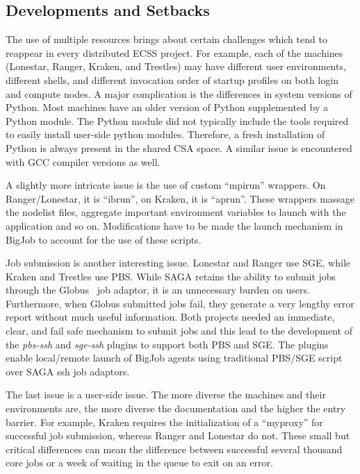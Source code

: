 \documentclass{sig-alternate}
\begin{document}
\subsection{Developments and Setbacks}

The use of multiple resources brings about certain challenges which tend to reappear in 
every distributed ECSS project. For example, each of the machines (Lonestar, Ranger, 
Kraken, and Trestles) may have different user environments, different shells, and 
different invocation order of startup profiles on both login and compute nodes. A major 
complication is the differences in system versions of Python. Most machines have an older 
version of Python supplemented by a Python module. The Python module did not typically 
include the tools required to easily install user-side python modules. Therefore, a fresh 
installation of Python is always present in the shared CSA space. A similar issue is 
encountered with GCC compiler versions as well.

A slightly more intricate issue is the use of custom ``mpirun'' wrappers. On
Ranger/Lonestar, it is ``ibrun'', on Kraken, it is ``aprun''. These wrappers
massage the nodelist files, aggregate important environment variables to launch
with the application and so on. Modifications have to be made the launch
mechanism in BigJob to account for the use of these scripts.

Job submission is another interesting issue. Lonestar and Ranger use SGE, while
Kraken and Trestles use PBS. While SAGA retains the ability to submit jobs
through the Globus~\cite{Globus} job adaptor, it is an unnecessary burden on
users. Furthermore, when Globus submitted jobs fail, they generate a very
lengthy error report without much useful information. Both projects needed an
immediate, clear, and fail safe mechanism to submit jobs and this lead to the
development of the \textit{pbs-ssh} and \textit{sge-ssh} plugins to support both
PBS and SGE. The plugins enable local/remote launch of BigJob agents using
traditional PBS/SGE script over SAGA ssh job adaptors.

The last issue is a user-side issue. The more diverse the machines and their
environments are, the more diverse the documentation and the higher the entry
barrier. For example, Kraken requires the initialization of a ``myproxy'' for
successful job submission, whereas Ranger and Lonestar do not. These small  but
critical differences can mean the difference between successful several thousand
core jobs or a week of waiting in the queue to exit on an error.
\end{document}
